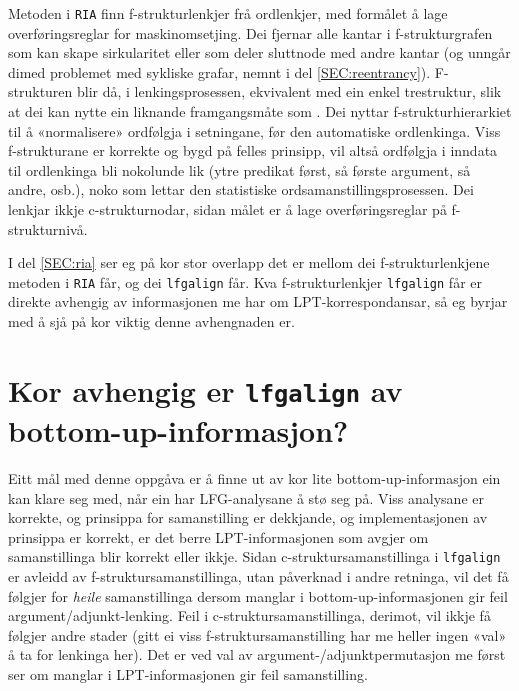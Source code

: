 \documentclass[12pt,a4paper,oneside,draft]{report}
\begin{document}
 Metoden i \texttt{RIA} \citep{graham2009osr,graham2009fts} finn
 f\hyp{}strukturlenkjer frå ordlenkjer, med formålet å lage
 overføringsreglar for maskinomsetjing. Dei fjernar alle kantar i
 f\hyp{}strukturgrafen som kan skape sirkularitet eller som deler
 sluttnode med andre kantar (og unngår dimed problemet med sykliske
 grafar, nemnt i del \ref{SEC:reentrancy}). F\hyp{}strukturen blir då,
 i lenkingsprosessen, ekvivalent med ein enkel trestruktur, slik at
 dei kan nytte ein liknande framgangsmåte som
 \citet{samuelsson2007apa}.  Dei nyttar f\hyp{}strukturhierarkiet til
 å «normalisere» ordfølgja i setningane, før den automatiske
 ordlenkinga. Viss f\hyp{}strukturane er korrekte og bygd på felles
 prinsipp, vil altså ordfølgja i inndata til ordlenkinga bli nokolunde
 lik (ytre predikat først, så første argument, så andre, osb.), noko
 som lettar den statistiske ordsamanstillingsprosessen.  Dei lenkjar
 ikkje c\hyp{}strukturnodar, sidan målet er å lage overføringsreglar
 på f\hyp{}strukturnivå.

 I del \ref{SEC:ria} ser eg på kor stor overlapp det er mellom dei
 f\hyp{}strukturlenkjene metoden i \texttt{RIA} får, og dei \texttt{lfgalign} får. Kva
 f\hyp{}strukturlenkjer \texttt{lfgalign} får er direkte avhengig av informasjonen
 me har om LPT\hyp{}korrespondansar, så eg byrjar med å sjå på kor viktig
 denne avhengnaden er.

 
\section{Kor avhengig er \texttt{lfgalign} av bottom-up-informasjon?}
\label{sec-5.3}

 Eitt mål med denne oppgåva er å finne ut av kor lite
 bottom-up-informasjon ein kan klare seg med, når ein har
 LFG-analysane å stø seg på. Viss analysane er korrekte, og prinsippa
 for samanstilling er dekkjande, og implementasjonen av prinsippa er
 korrekt, er det berre LPT\hyp{}informasjonen som avgjer om samanstillinga
 blir korrekt eller ikkje. Sidan c\hyp{}struktursamanstillinga i \texttt{lfgalign}
 er avleidd av f\hyp{}struktursamanstillinga, utan påverknad i andre
 retninga, vil det få følgjer for \emph{heile} samanstillinga dersom
 manglar i bottom-up-informasjonen gir feil
 argument/adjunkt-lenking. Feil i c\hyp{}struktursamanstillinga, derimot,
 vil ikkje få følgjer andre stader (gitt ei viss
 f\hyp{}struktursamanstilling har me heller ingen «val» å ta for lenkinga
 her). Det er ved val av argument-/adjunktpermutasjon me først ser om
 manglar i LPT-informasjonen gir feil samanstilling.
\end{document}
